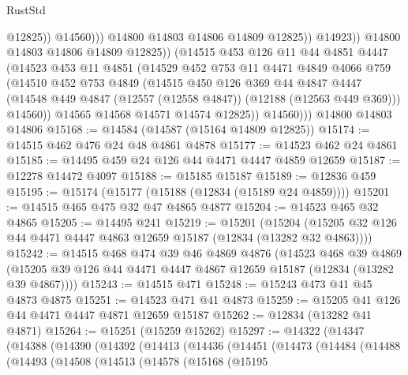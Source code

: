 \begin{lexlean}{RustStd}
\begin{coremodule}
{\begin{coremodule}
{{{{{{{{{{{{{{{{{{{{{{{{{{{{{{{{{{{{{{{{{{{{{{{{{{{{{{{{{{{{{{{{{{{{                              @12825))
                          @14560)))
                    @14800
                    @14803
                    @14806
                    @14809
                    @12825))
                @14923))
            @14800
            @14803
            @14806
            @14809
            @12825))
        (@14515
          @453
          @126
          @11
          @44
          @4851
          @4447
          (@14523
            @453
            @11
            @4851
            (@14529
              @452
              @753
              @11
              @4471
              @4849
              @4066
              @759
              (@14510
                @452
                @753
                @4849
                (@14515
                  @450
                  @126
                  @369
                  @44
                  @4847
                  @4447
                  (@14548 @449 @4847 (@12557 (@12558 @4847)) (@12188 (@12563 @449 @369)))
                  @14560))
              @14565
              @14568
              @14571
              @14574
              @12825))
          @14560)))
    @14800
    @14803
    @14806
@15168 := @14584 (@14587 (@15164 @14809 @12825))
@15174 := @14515 @462 @476 @24 @48 @4861 @4878
@15177 := @14523 @462 @24 @4861
@15185 := @14495 @459 @24 @126 @44 @4471 @4447 @4859 @12659
@15187 := @12278 @14472 @4097
@15188 := @15185 @15187
@15189 := @12836 @459
@15195 := @15174 (@15177 (@15188 (@12834 (@15189 @24 @4859))))
@15201 := @14515 @465 @475 @32 @47 @4865 @4877
@15204 := @14523 @465 @32 @4865
@15205 := @14495 @241
@15219 := @15201
    (@15204 (@15205 @32 @126 @44 @4471 @4447 @4863 @12659 @15187 (@12834 (@13282 @32 @4863))))
@15242 := @14515
    @468
    @474
    @39
    @46
    @4869
    @4876
    (@14523
      @468
      @39
      @4869
      (@15205 @39 @126 @44 @4471 @4447 @4867 @12659 @15187 (@12834 (@13282 @39 @4867))))
@15243 := @14515 @471
@15248 := @15243 @473 @41 @45 @4873 @4875
@15251 := @14523 @471 @41 @4873
@15259 := @15205 @41 @126 @44 @4471 @4447 @4871 @12659 @15187
@15262 := @12834 (@13282 @41 @4871)
@15264 := @15251 (@15259 @15262)
@15297 := @14322
    (@14347
      (@14388
        (@14390
          (@14392
            (@14413
              (@14436
                (@14451
                  (@14473
                    (@14484
                      (@14488
                        (@14493
                          (@14508
                            (@14513
                              (@14578
                                (@15168
                                  (@15195
}}}}}}}}}}}}}}}}}}}}}}}}}}}}}}}}}}}}}}}}}}}}}}}}}}}}}}}}}}}}}}}}}}}}
\end{coremodule}}
\end{coremodule}
\end{lexlean}
